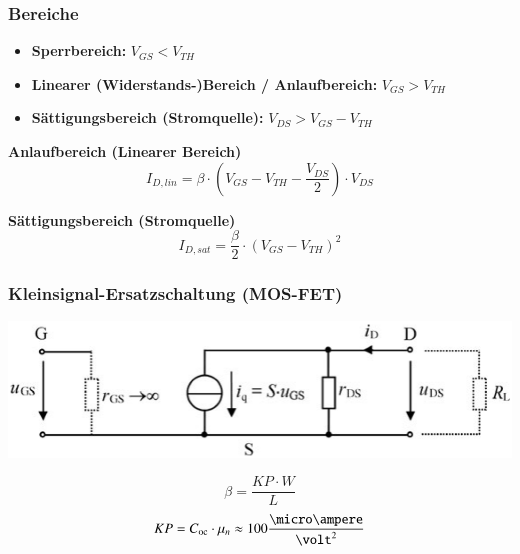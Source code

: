 \subsubsection{Bereiche}

\begin{itemize}
    \item \textbf{Sperrbereich:} $V_{GS} < V_{TH}$ 
    \item \textbf{Linearer (Widerstands-)Bereich / Anlaufbereich:} $V_{GS} > V_{TH}$
    \item \textbf{Sättigungsbereich (Stromquelle):} $V_{DS} > V_{GS} - V_{TH}$
\end{itemize}

\vspace{0.2cm}

\begin{minipage}[t]{0.48\columnwidth}
    \textbf{Anlaufbereich (Linearer Bereich)}
    $$ I_{D,lin} = \beta \cdot ( V_{GS} - V_{TH} - \frac{V_{DS}}{2} ) \cdot V_{DS} $$
\end{minipage}
\hfill
\begin{minipage}[t]{0.48\columnwidth}
    \textbf{Sättigungsbereich (Stromquelle)}
    $$ I_{D,sat} = \frac{\beta}{2} \cdot ( V_{GS} - V_{TH} )^2 $$
\end{minipage}



\subsubsection{Kleinsignal-Ersatzschaltung (MOS-FET)}

\begin{minipage}[t]{0.65\columnwidth}
    \includegraphics[align=t, width=\columnwidth]{images/mos_fet_kleinsignalersatzschaltung.png}
\end{minipage}
\hfill
\begin{minipage}[t]{0.33\columnwidth}
    $$ \beta = \frac{KP \cdot W}{L} $$
    $$ KP = C_{\rm oc} \cdot \mu_n \approx 100 \frac{\micro \ampere}{\volt^2} $$  %
\end{minipage}

